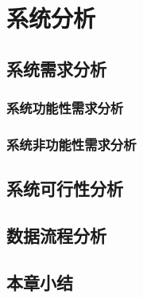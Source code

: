 

\chapter{系统分析}
\section{系统需求分析}
\subsection{系统功能性需求分析}

\subsection{系统非功能性需求分析}


\section{系统可行性分析}


\section{数据流程分析}


\section{本章小结}

 
